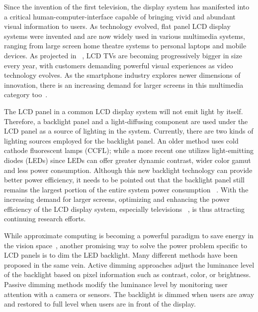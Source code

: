 Since the invention of the first television, the display system has manifested into a critical human-computer-interface 
capable of bringing vivid and abundant visual information to users. 
As technology evolved, flat panel LCD display systems were invented and are now 
widely used in various multimedia systems, ranging from large screen home theatre systems 
to personal laptops and mobile devices. As projected in ~\cite{lcd_future}, LCD TVs are becoming progressively bigger
in size every year, with customers demanding powerful visual experiences as video technology evolves. As the smartphone industry
explores newer dimensions of innovation, there is an increasing demand for larger screens in this multimedia category too~\cite{iPhone}.

The LCD panel in a common LCD display system will not emit light by itself. Therefore, a backlight panel and a light-diffusing 
component are used under the LCD panel as a source of lighting in the system.
Currently, there are two kinds of lighting sources employed for the backlight panel. 
An older method uses cold cathode fluorescent lamps (CCFL); while a more recent one utilizes 
light-emitting diodes (LEDs) since LEDs can offer greater dynamic contrast, wider color gamut and 
less power consumption. Although this new backlight technology can provide better power efficiency, 
it needs to be pointed out that the backlight panel still remains the largest portion of the entire 
system power consumption ~\cite{Sinofsky}. With the increasing demand for larger screens, 
optimizing and enhancing the power efficiency of the LCD display system, 
especially televisions ~\cite{Samsung}, is thus attracting continuing research efforts.

While approximate computing is becoming a powerful paradigm to save energy in the vision space~\cite{tvlsi2015}, 
another promising way to solve the power problem specific to LCD panels is to dim the LED backlight. Many different methods 
have been proposed in the same vein. Active dimming approaches adjust the luminance level of the backlight 
based on pixel information such as contrast, color, or brightness. Passive dimming methods modify the 
luminance level by monitoring user attention with a camera or sensors. 
The backlight is dimmed when users are away and restored to full level when users are in front of the display.

